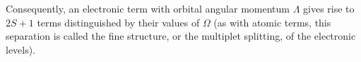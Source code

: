 Consequently, an electronic term with orbital angular momentum $\Lambda$ gives rise to $2S+1$ terms distinguished by their values of $\Omega$ (as with atomic terms, this separation is called the fine structure, or the multiplet splitting, of the electronic levels).
